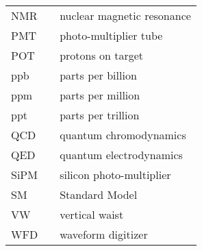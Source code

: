 {\begin{center}
\begin{tabular}{lll}
    NMR & \dotfill & nuclear magnetic resonance \\
    PMT  & \dotfill & photo-multiplier tube \\
    POT & \dotfill & protons on target \\
    ppb  & \dotfill & parts per billion \\
    ppm  & \dotfill & parts per million \\
    ppt  & \dotfill & parts per trillion \\
    QCD & \dotfill & quantum chromodynamics \\
    QED & \dotfill & quantum electrodynamics \\
    SiPM  & \dotfill & silicon photo-multiplier \\
    SM  & \dotfill & Standard Model \\
    VW & \dotfill & vertical waist \\
    WFD  & \dotfill & waveform digitizer \\

  \end{tabular}
\end{center}
\cleardoublepage

} %


\newpage
\endofprelim
